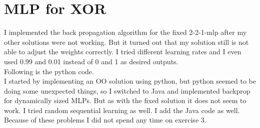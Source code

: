 \documentclass[paper=a4, fontsize=11pt]{scrartcl} %
\numberwithin{equation}{section} %
\numberwithin{figure}{section} %
\numberwithin{table}{section} %
\begin{document}
\section{MLP for XOR}

I implemented the back propagation algorithm for the fixed 2-2-1-mlp after my other solutions were not working. But it turned out that my solution still is not able to adjust the weights correctly. I tried different learning rates and I even used 0.99 and 0.01 instead of 0 and 1 as desired outputs.\\
Following is the python code.\\
I started by implementing an OO solution using python, but python seemed to be doing some unexpected things, so I switched to Java and implemented backprop for dynamically sized MLPs. But as with the fixed solution it does not seem to work. I tried random sequential learning as well. I add the Java code as well. Because of these problems I did not spend any time on exercise 3.
\end{document}
